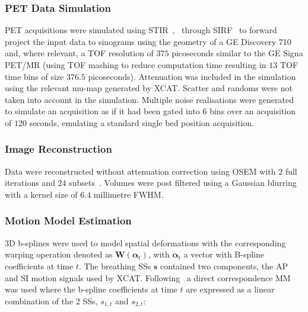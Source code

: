             \subsubsection{PET Data Simulation} \label{impact_of_tof_on_respiratory_motion_modelling_using_nac_pet_methods_pet_data_simulation}
                \gls{PET} acquisitions were simulated using \gls{STIR}~,~ through \gls{SIRF}~ to forward project the input data to sinograms using the geometry of a GE Discovery 710 and, where relevant, a \gls{TOF} resolution of $375$ picoseconds similar to the GE Signa \gls{PET}/\gls{MR} (using \gls{TOF} mashing to reduce computation time resulting in $13$ \gls{TOF} time bins of size $376.5$ picoseconds). Attenuation was included in the simulation using the relevant \gls{mu-map} generated by \gls{XCAT}. Scatter and randoms were not taken into account in the simulation. Multiple noise realisations were generated to simulate an acquisition as if it had been gated into $6$ bins over an acquisition of $120$ seconds, emulating a standard single bed position acquisition. 
            
            \subsubsection{Image Reconstruction} \label{impact_of_tof_on_respiratory_motion_modelling_using_nac_pet_methods_image_reconstruction}
                Data were reconstructed without attenuation correction using \gls{OSEM} with $2$ full iterations and $24$ subsets~. Volumes were post filtered using a Gaussian blurring with a kernel size of $6.4$ millimetre \gls{FWHM}.
            
            \subsubsection{Motion Model Estimation} \label{impact_of_tof_on_respiratory_motion_modelling_using_nac_pet_methods_motion_model_estimation}
                \gls{3D} b-splines were used to model spatial deformations with the corresponding warping operation denoted as $\mathbf{W}(\mathbf{\alpha}_t)$, with $\mathbf{\alpha}_t$ a vector with B-spline coefficients at time $t$. The breathing \gls{SS}s $\mathbf{s}$ contained two components, the \gls{AP} and \gls{SI} motion signals used by \gls{XCAT}. Following~ a direct correspondence \gls{MM} was used where the b-spline coefficients at time $t$ are expressed as a linear combination of the $2$ \gls{SS}s, $s_{1,t}$ and $s_{2,t}$:
            
